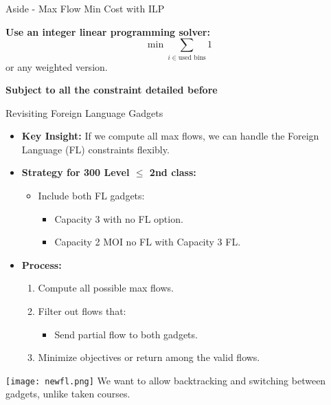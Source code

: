 \documentclass{beamer}
\begin{document}
\begin{frame}{Aside - Max Flow Min Cost with ILP}

    \textbf{Use an integer linear programming solver:}
    \[
    \min \sum_{i \in \text{used bins}} \text{1}
    \]
    or any weighted version.

    \textbf{Subject to all the constraint detailed before}
    
    

\end{frame}

\begin{frame}{Revisiting Foreign Language Gadgets}
    \begin{itemize}
        \item \textbf{Key Insight:} If we compute all max flows, we can handle the Foreign Language (FL) constraints flexibly.
        \item \textbf{Strategy for 300 Level \(\leq\) 2nd class:}
        \begin{itemize}
            \item Include both FL gadgets:
            \begin{itemize}
                \item Capacity 3 with no FL option.
                \item Capacity 2 MOI no FL with Capacity 3 FL.
            \end{itemize}
        \end{itemize}
        \item \textbf{Process:}
        \begin{enumerate}
            \item Compute all possible max flows.
            \item Filter out flows that:
            \begin{itemize}
                \item Send partial flow to both gadgets.
            \end{itemize}
            \item Minimize objectives or return among the valid flows.
        \end{enumerate}
    \end{itemize}
   
\end{frame}


\begin{frame}
    \centering
    \texttt{[image: newfl.png]}
    \tiny{We want to allow backtracking and switching between gadgets, unlike taken courses.}
   
\end{frame}
\end{document}
